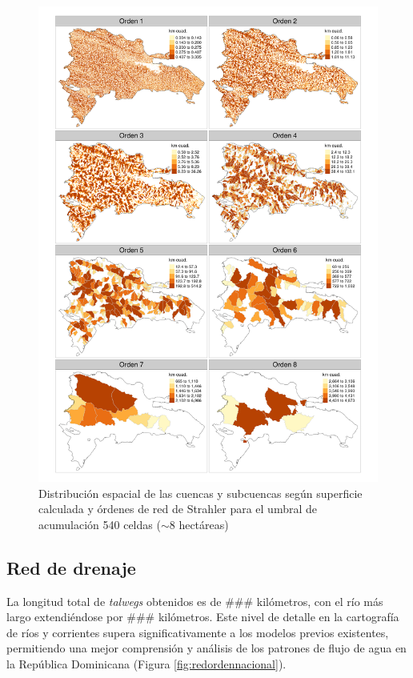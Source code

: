 \documentclass[spanish]{article}
\begin{document}
\begin{figure}

{\centering \includegraphics[width=1\linewidth]{figuras/cuencas-subcuencas-areas-ordenes} 

}

\caption{Distribución espacial de las cuencas y subcuencas según superficie calculada y órdenes de red de Strahler para el umbral de acumulación 540 celdas ($\sim$8 hectáreas)}\label{fig:ordenredcuencasmapa}
\end{figure}

\hypertarget{red-de-drenaje}{%
\subsection{Red de drenaje}\label{red-de-drenaje}}

La longitud total de \emph{talwegs} obtenidos es de \#\#\# kilómetros,
con el río más largo extendiéndose por \#\#\# kilómetros. Este nivel de
detalle en la cartografía de ríos y corrientes supera significativamente
a los modelos previos existentes, permitiendo una mejor comprensión y
análisis de los patrones de flujo de agua en la República Dominicana
(Figura \ref{fig:redordennacional}).
\end{document}
